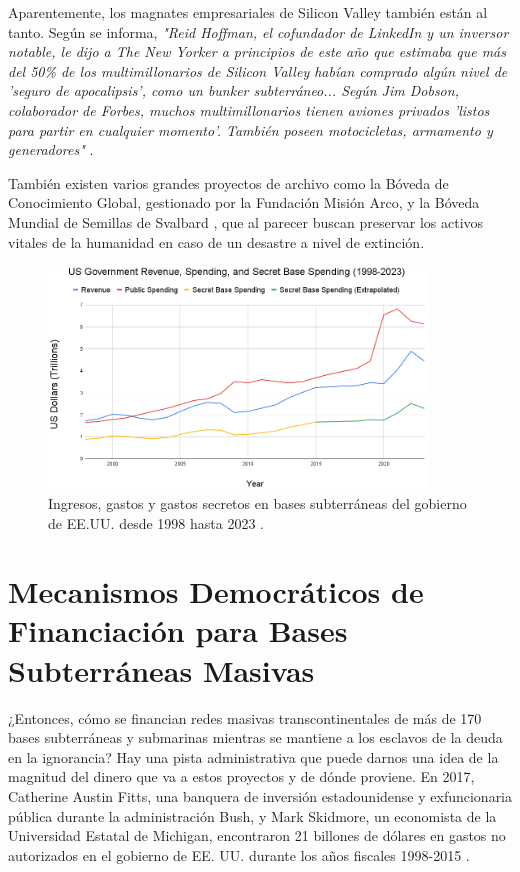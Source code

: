 \documentclass[10pt,twocolumn,letterpaper]{article}
\begin{document}
Aparentemente, los magnates empresariales de Silicon Valley también están al tanto. Según se informa, \textit{"Reid Hoffman, el cofundador de LinkedIn y un inversor notable, le dijo a The New Yorker a principios de este año que estimaba que más del 50\% de los multimillonarios de Silicon Valley habían comprado algún nivel de 'seguro de apocalipsis', como un bunker subterráneo... Según Jim Dobson, colaborador de Forbes, muchos multimillonarios tienen aviones privados 'listos para partir en cualquier momento'. También poseen motocicletas, armamento y generadores"} \cite{28}.

También existen varios grandes proyectos de archivo como la Bóveda de Conocimiento Global, gestionado por la Fundación Misión Arco, \cite{29} y la Bóveda Mundial de Semillas de Svalbard \cite{30}, que al parecer buscan preservar los activos vitales de la humanidad en caso de un desastre a nivel de extinción.

\begin{figure}[t]
\begin{center}
\includegraphics[width=0.9\textwidth]{govcrop2.png}
\end{center}
   \caption{Ingresos, gastos y gastos secretos en bases subterráneas del gobierno de EE.UU. desde 1998 hasta 2023 \cite{19}.}
   \label{fig:9}
\end{figure}
\section{Mecanismos Democráticos de Financiación para Bases Subterráneas Masivas}

¿Entonces, cómo se financian redes masivas transcontinentales de más de 170 bases subterráneas y submarinas mientras se mantiene a los esclavos de la deuda en la ignorancia? Hay una pista administrativa que puede darnos una idea de la magnitud del dinero que va a estos proyectos y de dónde proviene. En 2017, Catherine Austin Fitts, una banquera de inversión estadounidense y exfuncionaria pública durante la administración Bush, y Mark Skidmore, un economista de la Universidad Estatal de Michigan, encontraron 21 billones de dólares en gastos no autorizados en el gobierno de EE. UU. durante los años fiscales 1998-2015 \cite{11,12,13}.
\end{document}
